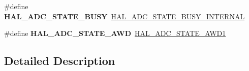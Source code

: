 \begin{DoxyCompactItemize}
\#define {\bfseries H\+A\+L\+\_\+\+A\+D\+C\+\_\+\+S\+T\+A\+T\+E\+\_\+\+B\+U\+SY}~\hyperlink{group___a_d_c___exported___types_ga7055248355e179ee208d23bd2ce8ba69}{H\+A\+L\+\_\+\+A\+D\+C\+\_\+\+S\+T\+A\+T\+E\+\_\+\+B\+U\+S\+Y\+\_\+\+I\+N\+T\+E\+R\+N\+AL}
\item 
\mbox{\label{group___h_a_l___a_d_c___aliased___defines_ga3147b9039ee1bc08da805d57a5136cd1}} 
\#define {\bfseries H\+A\+L\+\_\+\+A\+D\+C\+\_\+\+S\+T\+A\+T\+E\+\_\+\+A\+WD}~\hyperlink{group___a_d_c___exported___types_ga39ce295171a5e608097017fda4cfd7d5}{H\+A\+L\+\_\+\+A\+D\+C\+\_\+\+S\+T\+A\+T\+E\+\_\+\+A\+W\+D1}
\end{DoxyCompactItemize}


\subsection{Detailed Description}
